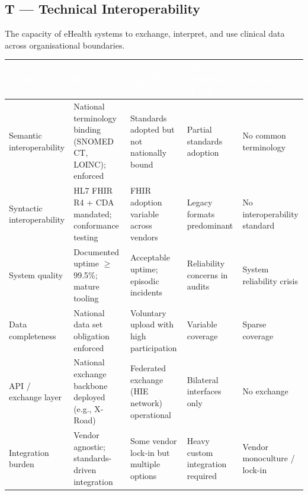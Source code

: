 \bigskip


\subsection*{T --- Technical Interoperability}

\noindent The capacity of eHealth systems to exchange, interpret, and use clinical data
across organisational boundaries.

\begin{table}[H]
\footnotesize
\begin{tabular}{p{2.5cm} p{3.1cm} p{3.1cm} p{3.1cm} p{3.1cm}}
\toprule
\rowcolor{headerblue}
\textcolor{white}{\textbf{Construct}} &
\textcolor{white}{\textbf{High (H)}} &
\textcolor{white}{\textbf{Medium (M)}} &
\textcolor{white}{\textbf{Low--Medium (L--M)}} &
\textcolor{white}{\textbf{Low (L)}} \\
\midrule

\rowcolor{rowgray}
Semantic interoperability &
National terminology binding (SNOMED CT, LOINC); enforced &
Standards adopted but not nationally bound &
Partial standards adoption &
No common terminology \\

Syntactic interoperability &
HL7 FHIR R4 + CDA mandated; conformance testing &
FHIR adoption variable across vendors &
Legacy formats predominant &
No interoperability standard \\

\rowcolor{rowgray}
System quality &
Documented uptime $\geq$99.5\%; mature tooling &
Acceptable uptime; episodic incidents &
Reliability concerns in audits &
System reliability crisis \\

Data completeness &
National data set obligation enforced &
Voluntary upload with high participation &
Variable coverage &
Sparse coverage \\

\rowcolor{rowgray}
API / exchange layer &
National exchange backbone deployed (e.g., X-Road) &
Federated exchange (HIE network) operational &
Bilateral interfaces only &
No exchange \\

Integration burden &
Vendor agnostic; standards-driven integration &
Some vendor lock-in but multiple options &
Heavy custom integration required &
Vendor monoculture / lock-in \\

\bottomrule
\end{tabular}
\end{table}


